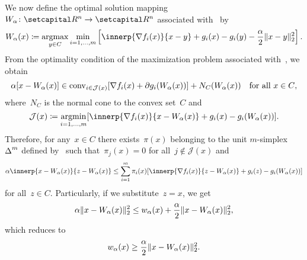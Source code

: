 \documentclass[../../main]{subfiles}
\begin{document}
            We now define the optimal solution mapping~$W_\alpha \colon \setR^n \to \setR^n$ associated with~ by
            \begin{equation} \label{eq:reg_lin_gap_MO_sol}
                W_\alpha(x) \coloneqq \argmax_{y \in C} \min_{i = 1, \dots, m} \left[ \innerp{\nabla f_i(x)}{x - y} + g_i(x) - g_i(y) - \frac{\alpha}{2} \norm{x - y}_2^2 \right] 
            .\end{equation} 
            From the optimality condition of the maximization problem associated with~, we obtain
            \begin{equation}
                \alpha [x - W_\alpha(x)] \in \operatorname{conv}_{i \in \mathcal{J}(x)} [ \nabla f_i(x) + \partial g_i(W_\alpha(x)) ] + N_C(W_\alpha(x)) \quad \text{for all~$x \in C$}
            ,\end{equation} 
            where~$N_C$ is the normal cone to the convex set~$C$ and
            \begin{equation}
                \mathcal{J}(x) \coloneqq \argmin_{i = 1, \dots, m} [\innerp{\nabla f_i(x)}{x - W_\alpha(x)} + g_i(x) - g_i(W_\alpha(x))]
            .\end{equation} 
            Therefore, for any~$x \in C$ there exists~$\pi(x)$ belonging to the unit $m$-simplex~$\operatorname{\Delta}^m$ defined by~ such that~$\pi_j(x) = 0$ for all~$j \notin \mathcal{J}(x)$ and
            \begin{equation} \label{eq:reg_lin_gap_optimality}
                \alpha \innerp{x - W_\alpha(x)}{z - W_\alpha(x)} \le \sum_{i = 1}^{m} \pi_i(x) [\innerp{\nabla f_i(x)}{z - W_\alpha(x)} + g_i(z) - g_i(W_\alpha(x))]
            \end{equation} 
            for all~$z \in C$.
            Particularly, if we substitute~$z = x$, we get
            \begin{equation}
                \alpha \lVert x - W_\alpha(x)\rVert_2^2 \le w_\alpha(x) + \frac{\alpha}{2} \lVert x - W_\alpha(x)\rVert_2^2
            ,\end{equation}
            which reduces to
            \begin{equation} \label{eq:reg_lin_gap_MO_LB}
                w_\alpha(x) \ge \frac{\alpha}{2} \lVert x - W_\alpha(x)\rVert_2^2
            .\end{equation}
\end{document}
